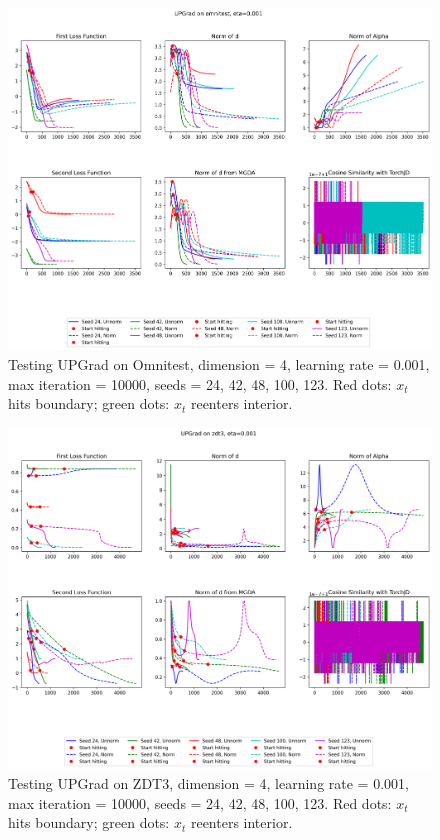 \documentclass{article}
\renewcommand{\|}{\biggr|}
\begin{document}
\begin{center}
\begin{figure}[h]
        \end{figure}
        \begin{figure}[h]
            \includegraphics[scale=0.4]{UPGrad_omnitest.png}
            \caption{Testing UPGrad on Omnitest, dimension = 4, learning rate = 0.001, max iteration = 10000, seeds = 24, 42, 48, 100, 123. Red dots: $x_t$ hits boundary; green dots: $x_t$ reenters interior.}
        \end{figure}
        \begin{figure}[h]
            \includegraphics[scale=0.4]{UPGrad_zdt3.png}
            \caption{Testing UPGrad on ZDT3, dimension = 4, learning rate = 0.001, max iteration = 10000, seeds = 24, 42, 48, 100, 123. Red dots: $x_t$ hits boundary; green dots: $x_t$ reenters interior.}
        \end{figure}
    \end{center}
\end{document}
